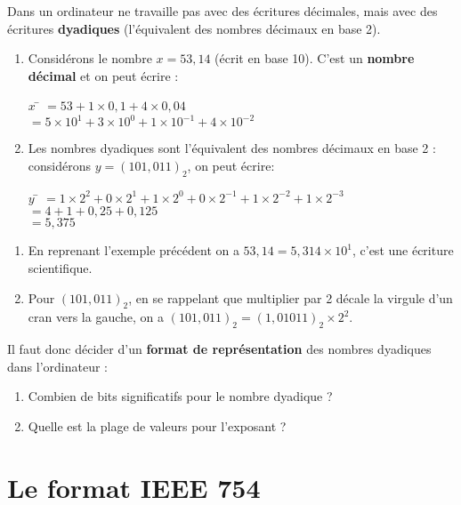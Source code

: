 \documentclass[a4paper,12pt,french]{book}
\begin{document}
Dans un ordinateur ne travaille pas avec des écritures décimales, mais avec des écritures \textbf{dyadiques} (l'équivalent des nombres décimaux en
base 2).
\begin{exemple}
\begin{enumerate}[\textbullet]
	\item 	Considérons le nombre $x = 53,14$ (écrit en base 10). C'est un \textbf{nombre décimal} et on peut écrire :
			\begin{tabbing}
				$x$	\=	$=53+1\times 0,1+4\times 0,04$\\
							\>	$=5\times 10^1+3\times 10^0+1\times 10^{-1}+4\times 10^{-2}$\\
			\end{tabbing}
	\item 	Les nombres dyadiques sont l'équivalent des nombres décimaux en base 2 : considérons $y=(101,011)_2	$, on peut écrire:
			\begin{tabbing}
				$y$	\=	$=1\times 2^2+0\times 2^1+1\times 2^0+0\times 2^{-1}+1\times 2^{-2}+1\times 2^{-3}$\\
							\>	$=4+1+0,25+0,125$\\
							\>	$=5,375$
			\end{tabbing}
\end{enumerate}
\end{exemple}

\begin{exemple}
\begin{enumerate}[\textbullet]
	\item 	En reprenant l'exemple précédent on a $53,14=5,314\times 10^1$, c'est une écriture scientifique.
	\item 	Pour $(101,011)_2$, en se rappelant que multiplier par 2 décale la virgule d'un cran vers la gauche, on a $(101,011)_2=(1,01011)_2\times
	2^2$.
\end{enumerate}
\end{exemple}

Il faut donc décider d'un \textbf{format de représentation} des nombres dyadiques dans l'ordinateur :
\begin{enumerate}[\textbullet]
	\item 	Combien de bits significatifs pour le nombre dyadique ?
	\item 	Quelle est la plage de valeurs pour l'exposant ?
\end{enumerate}
\section{Le format IEEE 754}
\end{document}
